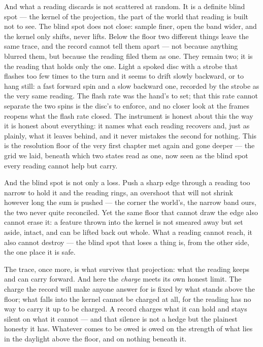 And what a reading discards is not scattered at random. It is a definite blind spot --- the kernel of the
projection, the part of the world that reading is built not to see. The blind spot does not close: sample finer,
open the band wider, and the kernel only shifts, never lifts. Below the floor two different things leave the
same trace, and the record cannot tell them apart --- not because anything blurred them, but because the reading
filed them as one. They remain two; it is the reading that holds only the one. Light a spoked disc with a strobe that
flashes too few times to the turn and it seems to drift slowly backward, or to hang still: a fast forward spin
and a slow backward one, recorded by the strobe as the very same reading. The flash rate was the hand's to set;
that this rate cannot separate the two spins is the disc's to enforce, and no closer look at the frames reopens
what the flash rate closed. The instrument is honest about this the way it is honest about everything: it names what each
reading recovers and, just as plainly, what it leaves behind, and it never mistakes the second for nothing.
This is the resolution floor of the very first chapter met again and gone deeper --- the grid we laid, beneath
which two states read as one, now seen as the blind spot every reading cannot help but carry.

And the blind spot is not only a loss. Push a sharp edge through a reading too narrow to hold it and the
reading rings, an overshoot that will not shrink however long the sum is pushed --- the corner the world's, the
narrow band ours, the two never quite reconciled. Yet the same floor that cannot draw the edge also cannot
erase it: a feature thrown into the kernel is not smeared away but set aside, intact, and can be lifted back out
whole. What a reading cannot reach, it also cannot destroy --- the blind spot that loses a thing is, from the
other side, the one place it is safe.

The trace, once more, is what survives that projection: what the reading keeps and can carry forward. And here
the \emph{charge} meets its own honest limit. The charge the record will make anyone answer for is fixed by
what stands above the floor; what falls into the kernel cannot be charged at all, for the reading has no way to
carry it up to be charged. A record charges what it can hold and stays silent on what it cannot --- and that
silence is not a hedge but the plainest honesty it has. Whatever comes to be owed is owed on the strength of
what lies in the daylight above the floor, and on nothing beneath it.

